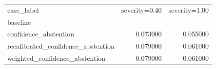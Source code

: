 \begin{tabular}{lrr}
\toprule
case_label & severity=0.40 & severity=1.00 \\
baseline &  &  \\
\midrule
confidence_abstention & 0.073000 & 0.055000 \\
recalibrated_confidence_abstention & 0.079000 & 0.061000 \\
weighted_confidence_abstention & 0.079000 & 0.061000 \\
\bottomrule
\end{tabular}
